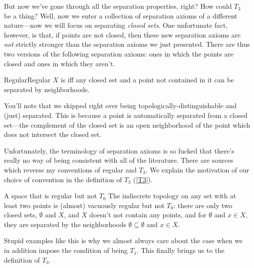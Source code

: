 But now we've gone through all the separation properties, right?  How could $T_3$ be a thing?  Well, now we enter a collection of separation axioms of a different nature---now we will focus on separating \emph{closed sets}.  One unfortunate fact, however, is that, if points are not closed, then these new separation axioms are \emph{not} strictly stronger than the separation axioms we just presented.  There are thus two versions of the following separation axioms:  ones in which the points are closed and ones in which they aren't.
\begin{dfn}{Regular}{Regular}
$X$ is  iff any closed set and a point not contained in it can be separated by neighborhoods.
\begin{rmk}
You'll note that we skipped right over being topologically-distinguishable and (just) separated.  This is because a point is automatically separated from a closed set---the complement of the closed set is an open neighborhood of the point which does not intersect the closed set.
\end{rmk}
\begin{rmk}
Unfortunately, the terminology of separation axioms is so fucked that there's really no way of being consistent with all of the literature.  There are sources which reverse my conventions of regular and $T_3$.  We explain the motivation of our choice of convention in the definition of $T_3$ (\cref{T3}).
\end{rmk}
\end{dfn}
\begin{exm}{A space that is regular but not $T_0$}{}
The indiscrete topology on any set with at least two points is (almost) vacuously regular but not $T_0$:  there are only two closed sets, $\emptyset$ and $X$, and $X$ doesn't not contain any points, and for $\emptyset$ and $x\in X$, they are separated by the neighborhoods $\emptyset \subseteq \emptyset$ and $x\in X$.
\end{exm}
Stupid examples like this is why we almost always care about the case when we in addition impose the condition of being $T_1$.  This finally brings us to the definition of $T_3$.
